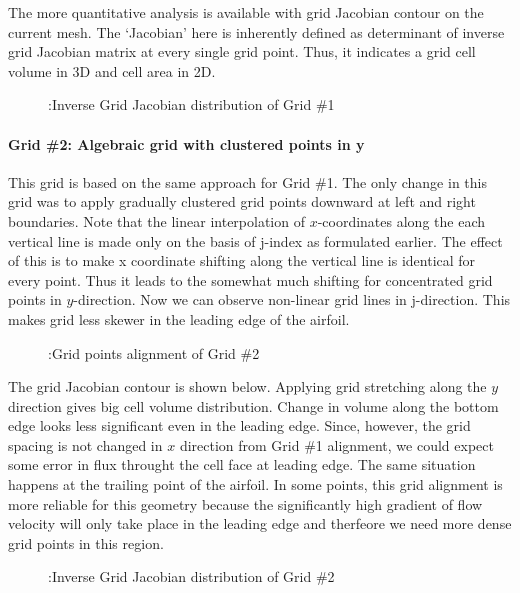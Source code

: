 \documentclass[letterpaper,10pt,english]{sphinxmanual}
\begin{document}
The more quantitative analysis is available with grid Jacobian contour on the current mesh. The ‘Jacobian’ here is inherently defined as determinant of inverse grid Jacobian matrix at every single grid point. Thus, it indicates a grid cell volume in 3D and cell area in 2D.
\begin{figure}[htbp]
\centering
\capstart

\noindent{}
\caption{:Inverse Grid Jacobian distribution of Grid \#1}\label{\detokenize{cases/grid_af:id2}}\end{figure}


\paragraph{Grid \#2: Algebraic grid with clustered points in y}
\label{\detokenize{cases/grid_af:grid-2-algebraic-grid-with-clustered-points-in-y}}
This grid is based on the same approach for Grid \#1. The only change in this grid was to apply gradually clustered grid points downward at left and right boundaries. Note that the linear interpolation of \(x\)-coordinates along the each vertical line is made only on the basis of j-index as formulated earlier. The effect of this is to make x coordinate shifting along the vertical line is identical for every point. Thus it leads to the somewhat much shifting for concentrated grid points in \(y\)-direction. Now we can observe non-linear grid lines in j-direction. This makes grid less skewer in the leading edge of the airfoil.
\begin{figure}[htbp]
\centering
\capstart

\noindent{}
\caption{:Grid points alignment of Grid \#2}\label{\detokenize{cases/grid_af:id3}}\end{figure}

The grid Jacobian contour is shown below. Applying grid stretching along the \(y\) direction gives big cell volume distribution. Change in volume along the bottom edge looks less significant even in the leading edge. Since, however, the grid spacing is not changed in \(x\) direction from Grid \#1 alignment, we could expect some error in flux throught the cell face at leading edge. The same situation happens at the trailing point of the airfoil. In some points, this grid alignment is more reliable for this geometry because the significantly high gradient of flow velocity will only take place in the leading edge and therfeore we need more dense grid points in this region.
\begin{figure}[htbp]
\centering
\capstart

\noindent{}
\caption{:Inverse Grid Jacobian distribution of Grid \#2}\label{\detokenize{cases/grid_af:id4}}\end{figure}
\end{document}
